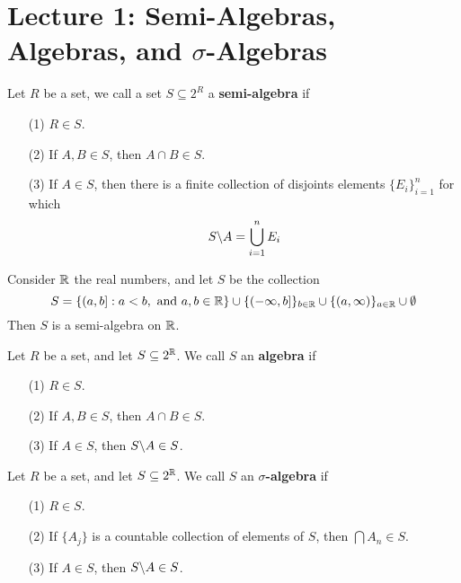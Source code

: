 \section*{Lecture 1: Semi-Algebras, Algebras, and $\sigma$-Algebras}

\begin{definition}
    Let $R$ be a set, we call a set  $S \subseteq 2^R$ a  \textbf{semi-algebra}
    if
    \begin{enumerate}
        \item[(1)] $R \in S$.

        \item[(2)] If $A,B \in S$, then  $A \cap B \in S$.

        \item[(3)] If $A \in S$, then there is a finite collection of disjoints
            elements $\{E_i\}_{i=1}^n$ for which
            \begin{equation*}
                S\backslash A=\bigcup_{i=1}^n{E_i}
            \end{equation*}
    \end{enumerate}
\end{definition}

\begin{example}\label{example_1}
    Consider $\mathbb{R}$ the real numbers, and let $S$ be the collection
    \begin{equation*}
        S=\{(a,b] : a<b, \text{ and } a,b \in \mathbb{R}\} \cup \{(-\infty,b]\}_{b \in
        \mathbb{R}} \cup \{(a,\infty)\}_{a \in \mathbb{R}} \cup \emptyset
    \end{equation*}
    Then $S$ is a semi-algebra on $\mathbb{R}$.
\end{example}

\begin{definition}
    Let $R$ be a set, and let  $S \subseteq 2^{\mathbb{R}}$. We call $S$ an
    \textbf{algebra} if
    \begin{enumerate}
        \item[(1)] $R \in S$.

        \item[(2)] If $A,B \in S$, then  $A \cap B \in S$.

        \item[(3)] If $A \in S$, then  $S\backslash A \in S$.
    \end{enumerate}
\end{definition}

\begin{definition}
    Let $R$ be a set, and let  $S \subseteq 2^{\mathbb{R}}$. We call $S$ an
    \textbf{$\sigma$-algebra} if
    \begin{enumerate}
        \item[(1)] $R \in S$.

        \item[(2)] If $\{A_j\}$ is a countable collection of elements of $S$,
            then $\bigcap{A_n} \in S$.

        \item[(3)] If $A \in S$, then  $S\backslash A \in S$.
    \end{enumerate}
\end{definition}

